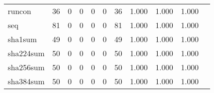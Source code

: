 \begin{longtable}{lp{1.2cm}p{1.2cm}p{1.2cm}p{1.2cm}p{1.2cm}p{1.2cm}p{1.2cm}p{1.2cm}p{1.2cm}p{1.2cm}}
runcon    &                                    36 &                                                  0 &                                                  0 &                                                  0 &                                                  0 &                                                 36 &                                         1.000 &                                              1.000 &                                              1.000 \\
seq       &                                    81 &                                                  0 &                                                  0 &                                                  0 &                                                  0 &                                                 81 &                                         1.000 &                                              1.000 &                                              1.000 \\
sha1sum   &                                    49 &                                                  0 &                                                  0 &                                                  0 &                                                  0 &                                                 49 &                                         1.000 &                                              1.000 &                                              1.000 \\
sha224sum &                                    50 &                                                  0 &                                                  0 &                                                  0 &                                                  0 &                                                 50 &                                         1.000 &                                              1.000 &                                              1.000 \\
sha256sum &                                    50 &                                                  0 &                                                  0 &                                                  0 &                                                  0 &                                                 50 &                                         1.000 &                                              1.000 &                                              1.000 \\
sha384sum &                                    50 &                                                  0 &                                                  0 &                                                  0 &                                                  0 &                                                 50 &                                         1.000 &                                              1.000 &                                              1.000 \\

\end{longtable}
